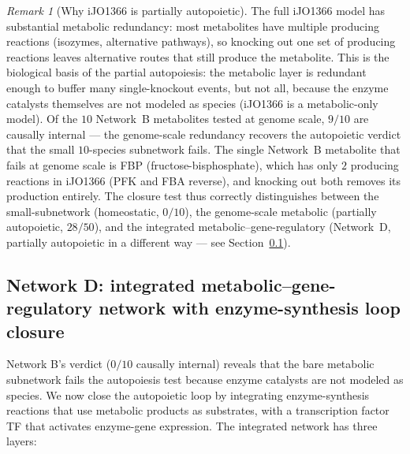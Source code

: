 \documentclass[11pt,a4paper]{article}
\theoremstyle{plain}
\theoremstyle{definition}
\theoremstyle{remark}
\newtheorem{remark}[theorem]{Remark}
\begin{document}
\begin{remark}[Why iJO1366 is partially autopoietic]
\label{rem:ijO1366-discussion}
The full iJO1366 model has substantial metabolic redundancy: most
metabolites have multiple producing reactions (isozymes, alternative
pathways), so knocking out one set of producing reactions leaves
alternative routes that still produce the metabolite. This is the
biological basis of the partial autopoiesis: the metabolic layer is
redundant enough to buffer many single-knockout events, but not all,
because the enzyme catalysts themselves are not modeled as species
(iJO1366 is a metabolic-only model). Of the $10$ Network~B metabolites
tested at genome scale, $9/10$ are causally internal --- the genome-scale
redundancy recovers the autopoietic verdict that the small $10$-species
subnetwork fails. The single Network~B metabolite that fails at genome
scale is FBP (fructose-bisphosphate), which has only $2$ producing
reactions in iJO1366 (PFK and FBA reverse), and knocking out both
removes its production entirely. The closure test thus correctly
distinguishes between the small-subnetwork (homeostatic, $0/10$),
the genome-scale metabolic (partially autopoietic, $28/50$), and the
integrated metabolic--gene-regulatory (Network~D, partially autopoietic
in a different way --- see Section~\ref{sec:autopoiesis-integrated}).
\end{remark}

\subsection{Network D: integrated metabolic--gene-regulatory network
with enzyme-synthesis loop closure}
\label{sec:autopoiesis-integrated}

Network B's verdict ($0/10$ causally internal) reveals that the bare
metabolic subnetwork fails the autopoiesis test because enzyme catalysts
are not modeled as species. We now close the autopoietic loop by
integrating enzyme-synthesis reactions that use metabolic products as
substrates, with a transcription factor TF that activates enzyme-gene
expression. The integrated network has three layers:
\end{document}
